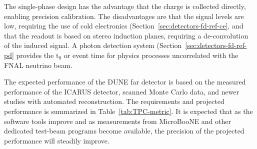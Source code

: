 The single-phase design has the advantage that the charge is collected directly, enabling precision calibration. The disadvantages are that the signal levels are low, requiring the use of cold electronics (Section~\ref{sec:detectors-fd-ref-ce}, and that the readout is based on stereo induction planes, requiring a de-convolution of the induced signal. A photon detection system (Section~\ref{sec:detectors-fd-ref-pd} provides the t$_0$ or event time for physics processes uncorrelated with the FNAL neutrino beam.



The expected performance of the DUNE far detector is based on the measured performance of the ICARUS detector, scanned Monte Carlo data, and newer studies with automated reconstruction. The requirements and projected performance is summarized in Table~\ref{tab:TPC-metric}. It is expected that as the software tools improve and as measurements from MicroBooNE and other dedicated test-beam programs become available, the precision of the projected performance will steadily improve.


